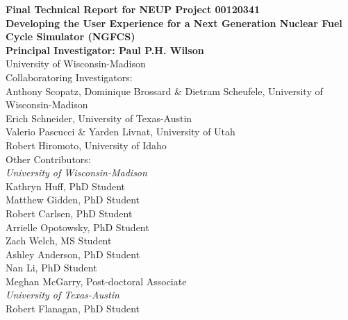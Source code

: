 
\begin{titlepage}
  \begin{center}
    {\Large\bfseries Final Technical Report for NEUP Project 00120341}\\[1cm]
    {\huge\bfseries Developing the User Experience for a Next Generation Nuclear Fuel Cycle Simulator (NGFCS)}\\

    \vspace{2cm}
    {\bfseries Principal Investigator: Paul P.H. Wilson}\\[5pt]
    University of Wisconsin-Madison\\

    \vspace{2cm}
    Collaboratoring Investigators:\\[5pt]
    Anthony Scopatz, Dominique Brossard \& Dietram Scheufele, University of Wisconsin-Madison\\
    Erich Schneider, University of Texas-Austin\\
    Valerio Pascucci \& Yarden Livnat, University of Utah\\
    Robert Hiromoto, University of Idaho\\

    \vspace{2cm}
    Other Contributors:\\[5pt]
    \textit{University of Wisconsin-Madison}\\
    Kathryn Huff, PhD Student\\
    Matthew Gidden, PhD Student\\
    Robert Carlsen, PhD Student\\
    Arrielle Opotowsky, PhD Student\\
    Zach Welch, MS Student\\
    Ashley Anderson, PhD Student\\
    Nan Li, PhD Student\\
    Meghan McGarry, Post-doctoral Associate\\[10pt]
    \textit{University of Texas-Austin}\\
    Robert Flanagan, PhD Student\\
    \vfill



    
  \end{center}
\end{titlepage}
